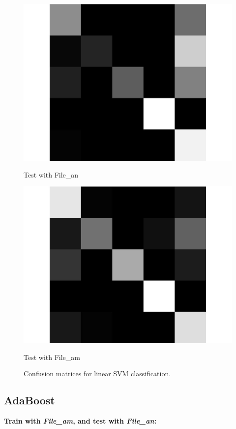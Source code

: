 \documentclass[letterpaper]{article}
\begin{document}
\begin{figure}
\begin{minipage}{.45\linewidth}
   \includegraphics[width=\linewidth]{confusionmatrices/confusionSVMQ1_1.png}
   \small\centerline{Test with File\_an}\normalsize
   \end{minipage}
\begin{minipage}{.45\linewidth}
   \includegraphics[width=\linewidth]{confusionmatrices/confusionSVMQ1_2.png}
   \small\centerline{Test with File\_am}\normalsize
   \end{minipage}
   \caption{Confusion matrices for linear SVM classification.}
\end{figure}

\subsection*{AdaBoost}
\textbf{Train with \textit{File\_am}, and test with \textit{File\_an}:}
\end{document}
